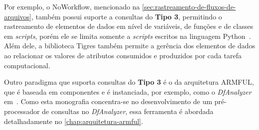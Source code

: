 Por exemplo, o NoWorkflow, mencionado na \autoref{sec:rastreamento-de-fluxos-de-arquivos}, também possui suporte a consultas do \textbf{Tipo 3}, permitindo o rastreamento de elementos de dados em nível de variáveis, de funções e de classes em \textit{scripts}, porém ele se limita somente a \textit{scripts} escritos na linguagem Python~\cite{murta2014noworkflow}. Além dele, a biblioteca Tigres também permite a gerência dos elementos de dados ao relacionar os valores de atributos consumidos e produzidos por cada tarefa computacional.

Outro paradigma que suporta consultas do \textbf{Tipo 3} é o da arquitetura ARMFUL, que é baseada em componentes e é instanciada, por exemplo, como o \textit{DfAnalyzer} em~\cite{silva2017raw}. Como esta monografia concentra-se no desenvolvimento de um pré-processador de consultas no \textit{DfAnalyzer}, essa ferramenta é abordada detalhadamente no \autoref{chap:arquitetura-armful}.